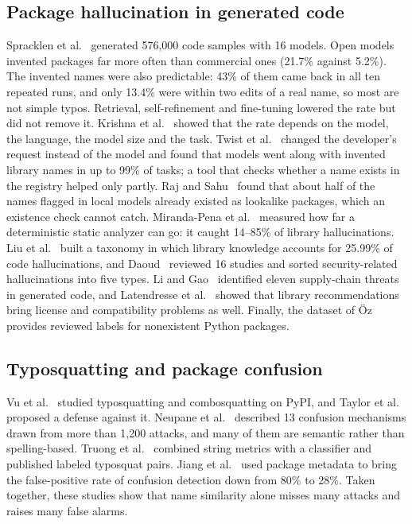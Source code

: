 \documentclass[conference]{IEEEtran}
\begin{document}
\subsection{Package hallucination in generated code}
Spracklen et al.~\cite{spracklen2025} generated 576{,}000 code samples with 16 models. Open models invented
packages far more often than commercial ones (21.7\% against 5.2\%). The invented names were also predictable: 43\%
of them came back in all ten repeated runs, and only 13.4\% were within two edits of a real name, so most are not
simple typos. Retrieval, self-refinement and fine-tuning lowered the rate but did not remove it. Krishna
et al.~\cite{krishna2025} showed that the rate depends on the model, the language, the model size and the task.
Twist et al.~\cite{twist2026} changed the developer's request instead of the model and found that models went along
with invented library names in up to 99\% of tasks; a tool that checks whether a name exists in the registry helped
only partly. Raj and Sahu~\cite{raj2026} found that about half of the names flagged in local models already existed
as lookalike packages, which an existence check cannot catch. Miranda-Pena et al.~\cite{mirandapena2026} measured
how far a deterministic static analyzer can go: it caught 14--85\% of library hallucinations. Liu
et al.~\cite{liu2026} built a taxonomy in which library knowledge accounts for 25.99\% of code hallucinations, and
Daoud~\cite{daoud2026} reviewed 16 studies and sorted security-related hallucinations into five types. Li and
Gao~\cite{ligao2025} identified eleven supply-chain threats in generated code, and Latendresse
et al.~\cite{latendresse2024} showed that library recommendations bring license and compatibility problems as well.
Finally, the dataset of Öz~\cite{oz2026} provides reviewed labels for nonexistent Python packages.

\subsection{Typosquatting and package confusion}
Vu et al.~\cite{vu2020} studied typosquatting and combosquatting on PyPI, and Taylor et al.~\cite{taylor2020}
proposed a defense against it. Neupane et al.~\cite{neupane2023} described 13 confusion mechanisms drawn from more
than 1{,}200 attacks, and many of them are semantic rather than spelling-based. Truong et al.~\cite{truong2025}
combined string metrics with a classifier and published labeled typosquat pairs. Jiang et al.~\cite{jiang2026} used
package metadata to bring the false-positive rate of confusion detection down from 80\% to 28\%. Taken together,
these studies show that name similarity alone misses many attacks and raises many false alarms.
\end{document}
